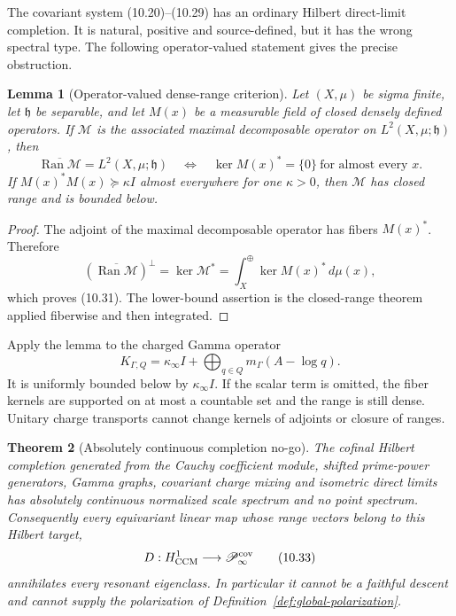 \documentclass[11pt]{amsart}
\newtheorem{theorem}{Theorem}[section]
\newtheorem{lemma}[theorem]{Lemma}
\theoremstyle{definition}
\theoremstyle{remark}
\newcommand{\dd}{\,d}
\begin{document}
The covariant system (10.20)--(10.29) has an ordinary Hilbert direct-limit
completion.  It is natural, positive and source-defined, but it has the
wrong spectral type.  The following operator-valued statement gives the
precise obstruction.

\begin{lemma}[Operator-valued dense-range criterion]
\label{lem:operator-dense-range}
Let \((X,\mu)\) be sigma finite, let \(\mathfrak h\) be separable, and let
\(M(x)\) be a measurable field of closed densely defined operators.  If
\(\mathcal M\) is the associated maximal decomposable operator on
\(L^2(X,\mu;\mathfrak h)\), then
\[
 \boxed{
 \overline{\operatorname{Ran}\mathcal M}
 =L^2(X,\mu;\mathfrak h)
 \quad\Longleftrightarrow\quad
 \ker M(x)^*=\{0\}\ \text{for almost every }x.}
 \tag{10.31}
\]
If \(M(x)^*M(x)\succeq\kappa I\) almost everywhere for one
\(\kappa>0\), then \(\mathcal M\) has closed range and is bounded below.
\end{lemma}

\begin{proof}
The adjoint of the maximal decomposable operator has fibers \(M(x)^*\).
Therefore
\[
 (\overline{\operatorname{Ran}\mathcal M})^\perp
 =\ker\mathcal M^*
 =\int_X^\oplus\ker M(x)^*\dd\mu(x),
\]
which proves (10.31).  The lower-bound assertion is the closed-range
theorem applied fiberwise and then integrated.
\end{proof}

Apply the lemma to the charged Gamma operator
\[
 K_{\Gamma,Q}
 =\kappa_\infty I+\bigoplus_{q\in Q}m_\Gamma(A-\log q).
 \tag{10.32}
\]
It is uniformly bounded below by \(\kappa_\infty I\).  If the scalar term
is omitted, the fiber kernels are supported on at most a countable set and
the range is still dense.  Unitary charge transports cannot change kernels
of adjoints or closure of ranges.

\begin{theorem}[Absolutely continuous completion no-go]
\label{thm:ac-no-go}
The cofinal Hilbert completion generated from the Cauchy coefficient
module, shifted prime-power generators, Gamma graphs, covariant charge
mixing and isometric direct limits has absolutely continuous normalized
scale spectrum and no point spectrum.  Consequently every equivariant
linear map whose range vectors belong to this Hilbert target,
\[
 D:H^1_{\rm CCM}\longrightarrow\mathscr P_\infty^{\rm cov}
 \tag{10.33}
\]
annihilates every resonant eigenclass.  In particular it cannot be a
faithful descent and cannot supply the polarization of
Definition~\ref{def:global-polarization}.
\end{theorem}
\end{document}
